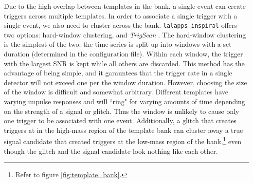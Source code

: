 Due to the high overlap between templates in the bank, a single event can
create triggers across multiple templates. In order to associate a single
trigger with a single event, we also need to cluster across the bank.
\texttt{lalapps\_inspiral} offers two options: hard-window clustering, and
\emph{TrigScan} \cite{SenguptaTrigScan}. The hard-window clustering is the
simplest of the two: the time-series is split up into windows with a set
duration (determined in the configuration file). Within each window, the
trigger with the largest \ac{SNR} is kept while all others are discarded. This
method has the advantage of being simple, and it garauntees that the trigger
rate in a single detector will not exceed one per the window duration. However,
choosing the size of the window is difficult and somewhat arbitrary. Different
templates have varying impulse responses and will ``ring" for varying amounts
of time depending on the strength of a signal or glitch. Thus the window is
unlikely to cause only one trigger to be associated with one event.
Additionally, a glitch that creates triggers at in the high-mass region of the
template bank can cluster away a true signal candidate that created triggers at
the low-mass region of the bank,\footnote{Refer to figure
\ref{fig:template_bank}.} even though the glitch and the signal candidate look
nothing like each other.

